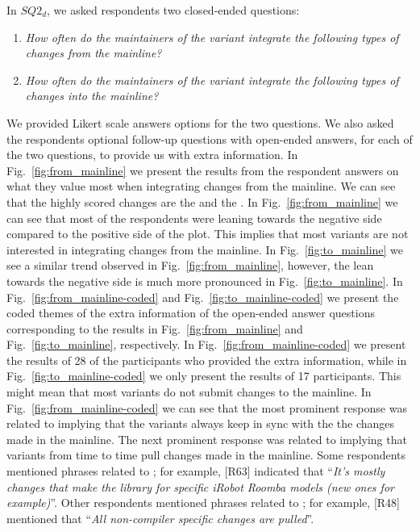 In $SQ2_{d}$, we asked respondents two closed-ended questions:
\begin{enumerate}
	\item \textit{How often do the maintainers of the variant integrate the following types of changes from the mainline?}
	\item \textit{How often do the maintainers of the variant integrate the following types of changes into the mainline?}
\end{enumerate} 
We provided Likert scale answers options for the two questions. We also asked the respondents optional follow-up questions with open-ended answers, for each of the two questions, to provide us with extra information.
In Fig.~\ref{fig:from_mainline} we present the results from the respondent answers on what they value most when integrating changes from the mainline. We can see that the highly scored changes are the  and the . In Fig.~\ref{fig:from_mainline} we can see that most of the respondents were leaning towards the negative side compared to the positive side of the plot.
This implies that most variants are not interested in integrating changes from the mainline.
In Fig.~\ref{fig:to_mainline} we see a similar trend observed in Fig.~\ref{fig:from_mainline}, however, the lean towards the negative side is much more pronounced in Fig.~\ref{fig:to_mainline}.
In Fig.~\ref{fig:from_mainline-coded} and Fig.~\ref{fig:to_mainline-coded} we present the coded themes of the extra information of the open-ended answer questions corresponding to the results in Fig.~\ref{fig:from_mainline} and Fig.~\ref{fig:to_mainline}, respectively. In Fig.~\ref{fig:from_mainline-coded} we present the results of 28 of the participants who provided the extra information, while in Fig.~\ref{fig:to_mainline-coded} we only present the results of 17 participants. This might mean that most variants do not submit changes to the mainline.
In Fig.~\ref{fig:from_mainline-coded} we can see that the most prominent response was related to  implying that the variants always keep in sync with the the changes made in the mainline. The next prominent response was related to  implying that variants from time to time pull changes made in the mainline. Some respondents mentioned phrases related to ; for example, [R63] indicated that ``\emph{It's mostly changes that make the library for specific iRobot Roomba models (new ones for example)}''. Other respondents mentioned phrases related to ; for example, [R48] mentioned that ``\emph{All non-compiler specific changes are pulled}''.
